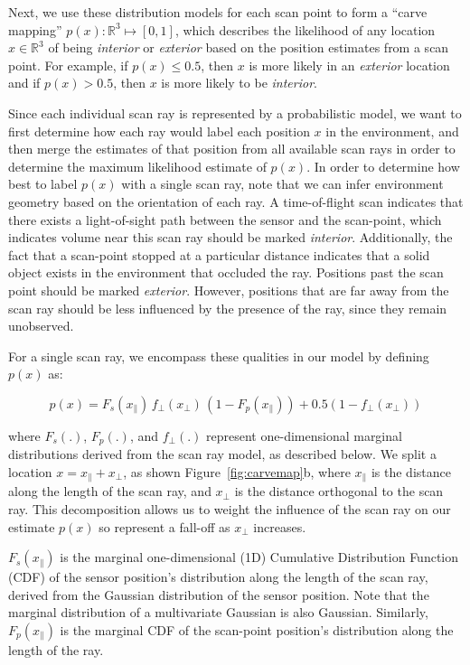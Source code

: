 \documentclass[12pt,onecolumn,oneside]{book}
\begin{document}
Next, we use these distribution models for each scan point to form a ``carve mapping'' $p(x) : \mathbb{R}^3 \mapsto [0,1]$, which describes the likelihood of any location $x \in \mathbb{R}^3$ of being {\it interior} or {\it exterior} based on the position estimates from a scan point.  For example, if $p(x) \leq 0.5$, then $x$ is more likely in an {\it exterior} location and if $p(x) > 0.5$, then $x$ is more likely to be {\it interior}.  

Since each individual scan ray is represented by a probabilistic model, we want to first determine how each ray would label each position $x$ in the environment, and then merge the estimates of that position from all available scan rays in order to determine the maximum likelihood estimate of $p(x)$.  In order to determine how best to label $p(x)$ with a single scan ray, note that we can infer environment geometry based on the orientation of each ray.  A time-of-flight scan indicates that there exists a light-of-sight path between the sensor and the scan-point, which indicates volume near this scan ray should be marked {\it interior}.  Additionally, the fact that a scan-point stopped at a particular distance indicates that a solid object exists in the environment that occluded the ray.  Positions past the scan point should be marked {\it exterior}.  However, positions that are far away from the scan ray should be less influenced by the presence of the ray, since they remain unobserved.  

For a single scan ray, we encompass these qualities in our model by defining $p(x)$ as:

\begin{equation}
	p(x) = F_s(x_{\parallel}) \, f_{\perp}(x_{\perp}) \, (1 - F_p(x_{\parallel})) + 0.5 (1 - f_{\perp}(x_{\perp}))
	\label{eq:carvemap}
\end{equation}

where $F_s(.)$, $F_p(.)$, and $f_{\perp}(.)$ represent one-dimensional marginal distributions derived from the scan ray model, as described below.  We split a location $x = x_{\parallel} + x_{\perp}$, as shown Figure~\ref{fig:carvemap}b, where $x_{\parallel}$ is the distance along the length of the scan ray, and $x_{\perp}$ is the distance orthogonal to the scan ray.  This decomposition allows us to weight the influence of the scan ray on our estimate $p(x)$ so represent a fall-off as $x_{\perp}$ increases.

$F_s(x_{\parallel})$ is the marginal one-dimensional (1D) Cumulative Distribution Function (CDF) of the sensor position's distribution along the length of the scan ray, derived from the Gaussian distribution of the sensor position.  Note that the marginal distribution of a multivariate Gaussian is also Gaussian.  Similarly, $F_p(x_{\parallel})$ is the marginal CDF of the scan-point position's distribution along the length of the ray. 
\end{document}
